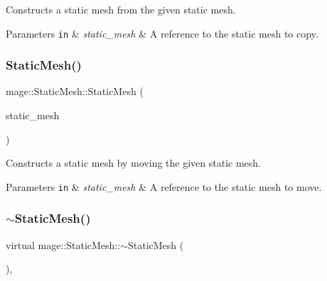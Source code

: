 Constructs a static mesh from the given static mesh.


\begin{DoxyParams}[1]{Parameters}
\mbox{\tt in}  & {\em static\+\_\+mesh} & A reference to the static mesh to copy. \\
\hline
\end{DoxyParams}
\hypertarget{classmage_1_1_static_mesh_a3841addfb07533099f38602f8728db7e}{}\label{classmage_1_1_static_mesh_a3841addfb07533099f38602f8728db7e} 
\subsubsection{\texorpdfstring{Static\+Mesh()}{StaticMesh()}\hspace{0.1cm}{\footnotesize\ttfamily [4/4]}}
{\footnotesize\ttfamily mage\+::\+Static\+Mesh\+::\+Static\+Mesh (\begin{DoxyParamCaption}\item[{\hyperlink{classmage_1_1_static_mesh}{Static\+Mesh} \&\&}]{static\+\_\+mesh }\end{DoxyParamCaption})\hspace{0.3cm}{\ttfamily [default]}}

Constructs a static mesh by moving the given static mesh.


\begin{DoxyParams}[1]{Parameters}
\mbox{\tt in}  & {\em static\+\_\+mesh} & A reference to the static mesh to move. \\
\hline
\end{DoxyParams}
\hypertarget{classmage_1_1_static_mesh_a68bab11bb133738f5ebc7ce5579d98d8}{}\label{classmage_1_1_static_mesh_a68bab11bb133738f5ebc7ce5579d98d8} 
\subsubsection{\texorpdfstring{$\sim$\+Static\+Mesh()}{~StaticMesh()}}
{\footnotesize\ttfamily virtual mage\+::\+Static\+Mesh\+::$\sim$\+Static\+Mesh (\begin{DoxyParamCaption}{ }\end{DoxyParamCaption})\hspace{0.3cm}{\ttfamily [virtual]}, {\ttfamily [default]}}

